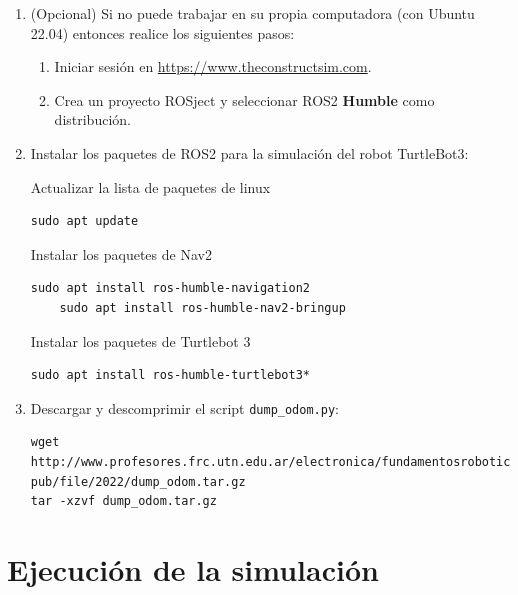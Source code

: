\documentclass[tp]{lcc}
\begin{document}
\begin{enumerate}

\item (Opcional) Si no puede trabajar en su propia computadora (con Ubuntu 22.04) entonces realice los siguientes pasos:

\begin{enumerate}
	\item Iniciar sesión en \url{https://www.theconstructsim.com}.
	\item Crea un proyecto ROSject y seleccionar ROS2 {\bf Humble} como distribución.
\end{enumerate}


\item Instalar los paquetes de ROS2 para la simulación del robot TurtleBot3:

Actualizar la lista de paquetes de linux
\begin{lstlisting}[style=bash] 
    sudo apt update
\end{lstlisting}

Instalar los paquetes de Nav2 
\begin{lstlisting}[style=bash] 
	sudo apt install ros-humble-navigation2
	sudo apt install ros-humble-nav2-bringup
\end{lstlisting}

Instalar los paquetes de Turtlebot 3
\begin{lstlisting}[style=bash] 
	sudo apt install ros-humble-turtlebot3*
\end{lstlisting}

	\item Descargar y descomprimir el script \lstinline[style=bash]{dump_odom.py}:
	
\begin{lstlisting}[style=bash] 
wget http://www.profesores.frc.utn.edu.ar/electronica/fundamentosroboticamovil/\
pub/file/2022/dump_odom.tar.gz
tar -xzvf dump_odom.tar.gz
\end{lstlisting}
	
\end{enumerate}

\section{Ejecución de la simulación}
\end{document}
